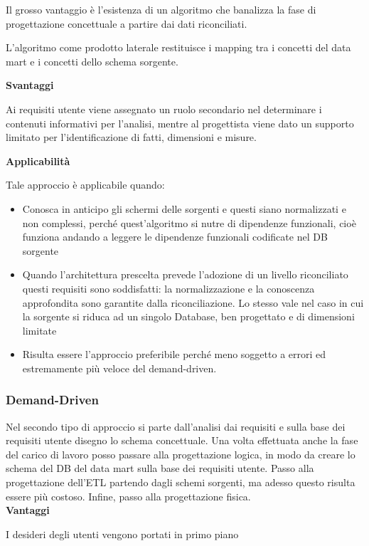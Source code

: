 Il grosso vantaggio è l’esistenza di un algoritmo che banalizza la fase di progettazione concettuale a partire dai dati riconciliati. 

L’algoritmo come prodotto laterale restituisce i mapping tra i concetti del data mart e i concetti dello schema sorgente. 

\textbf{Svantaggi}

Ai requisiti utente viene assegnato un ruolo secondario nel determinare i contenuti informativi per l’analisi, mentre al progettista viene dato un supporto limitato per l’identificazione di fatti, dimensioni e misure.

\textbf{Applicabilità}

Tale approccio è applicabile quando:
\begin{itemize}
	\item 
	Conosca in anticipo gli schermi delle sorgenti e questi siano normalizzati e non complessi, perché quest’algoritmo si nutre di dipendenze funzionali, cioè funziona andando a leggere le dipendenze funzionali codificate nel DB sorgente
	\item 
	Quando l’architettura prescelta prevede l’adozione di un livello riconciliato questi requisiti sono soddisfatti: la normalizzazione e la conoscenza approfondita sono garantite dalla riconciliazione. Lo stesso vale nel caso in cui la sorgente si riduca ad un singolo Database, ben progettato e di dimensioni limitate
	\item
	Risulta essere l’approccio preferibile perché meno soggetto a errori ed estremamente più veloce del demand-driven.
\end{itemize}

\subsubsection{Demand-Driven}
Nel secondo tipo di approccio si parte dall’analisi dai requisiti e sulla base dei requisiti utente disegno lo schema concettuale. Una volta effettuata anche la fase del carico di lavoro posso passare alla progettazione logica, in modo da creare lo schema del DB del data mart sulla base dei requisiti utente. Passo alla progettazione dell’ETL partendo dagli schemi sorgenti, ma adesso questo risulta essere più costoso. Infine, passo alla progettazione fisica.\\

\textbf{Vantaggi}

I desideri degli utenti vengono portati in primo piano

